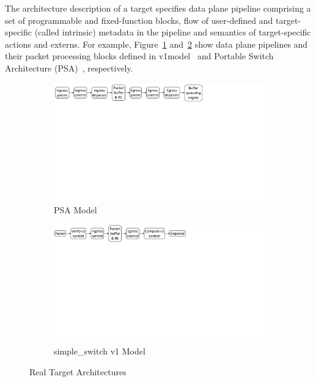 \documentclass[10pt,sigconf,letterpaper,anonymous]{acmart}
\begin{document}
The architecture description of a target specifies data plane pipeline comprising a set of pro\-gram\-ma\-ble and fixed-function blocks, flow of user-defined and target-specific (called intrinsic) metadata in the pipeline and semantics of target-specific actions and externs.
For example, Figure~\ref{subfig:psa-model} and~\ref{subfig:v1model} show data plane pipelines and their packet processing blocks defined in v1model~\cite{simple_switch.md} and Portable Switch Architecture (PSA)~\cite{psa}, respectively.

\begin{figure}
    \begin{subfigure}{\linewidth}
        \centering
        \includegraphics[trim=7 450 281 0, clip,scale=0.36]{psa-pipeline.pdf}
        \caption{PSA Model}
        \label{subfig:psa-model}
    \end{subfigure}
    \begin{subfigure}[b]{\linewidth}
        \centering
        \includegraphics[trim=3 460 357 0, clip,scale=0.35]{v1model-pipeline.pdf}
        \caption{simple\_switch v1 Model}
        \label{subfig:v1model}
    \end{subfigure}
\caption{Real Target Architectures}
\label{fig:real-target-architectures}
\end{figure}
\end{document}
